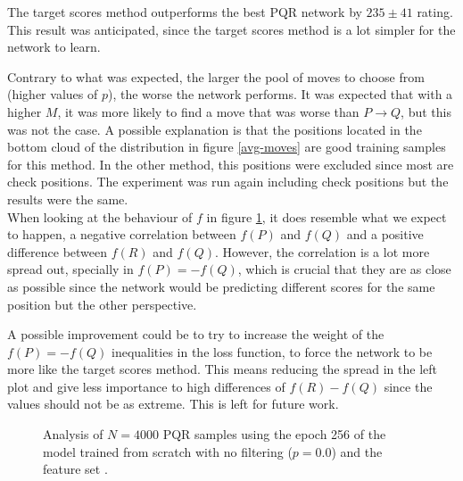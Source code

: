 The target scores method outperforms the best PQR network by $235 \pm 41$ rating. This result was anticipated, since the target scores method is a lot simpler for the network to learn.

Contrary to what was expected, the larger the pool of moves to choose from (higher values of $p$), the worse the network performs. It was expected that with a higher $M$, it was more likely to find a move that was worse than $P \rightarrow Q$, but this was not the case. A possible explanation is that the positions located in the bottom cloud of the distribution in figure \ref{avg-moves} are good training samples for this method. In the other method, this positions were excluded since most are check positions. The experiment was run again including check positions but the results were the same. \\

\newpage
When looking at the behaviour of $f$ in figure \ref{pqr-scratch}, it does resemble what we expect to happen, a negative correlation between $f(P)$ and $f(Q)$ and a positive difference between $f(R)$ and $f(Q)$. However, the correlation is a lot more spread out, specially in $f(P)=-f(Q)$, which is crucial that they are as close as possible since the network would be predicting different scores for the same position but the other perspective.

A possible improvement could be to try to increase the weight of the $f(P)=-f(Q)$ inequalities in the loss function, to force the network to be more like the target scores method. This means reducing the spread in the left plot and give less importance to high differences of $f(R)-f(Q)$ since the values should not be as extreme. This is left for future work.

\begin{figure}[H]
\centering
{}
\caption{Analysis of $N=4000$ PQR samples using the epoch 256 of the model trained from scratch with no filtering ($p=0.0$) and the feature set .}
\label{pqr-scratch}
\end{figure}

